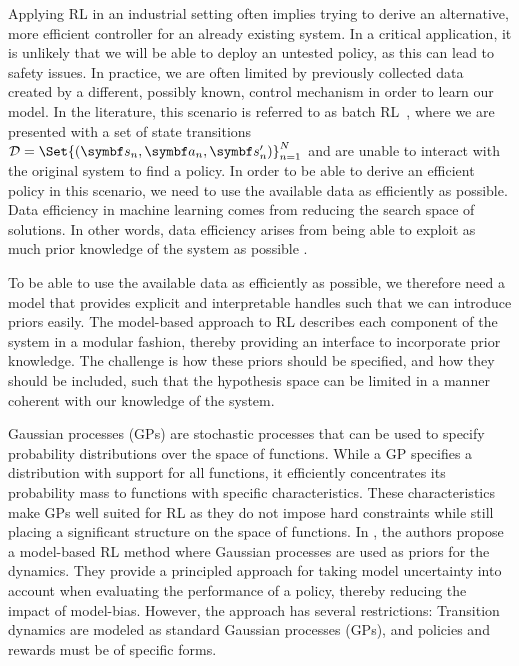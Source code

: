 Applying RL in an industrial setting often implies trying to derive an alternative, more efficient controller for an already existing system.
In a critical application, it is unlikely that we will be able to deploy an untested policy, as this can lead to safety issues.
In practice, we are often limited by previously collected data created by a different, possibly known, control mechanism in order to learn our model.
In the literature, this scenario is referred to as batch RL~\parencite{lange_batch_2012}, where we are presented with a set of state transitions $\Dc = \Set{(\mat{s}_n, \mat{a}_n, \mat{s}_n^\prime)}_{n=1}^N$ and are unable to interact with the original system to find a policy.
In order to be able to derive an efficient policy in this scenario, we need to use the available data as efficiently as possible.
Data efficiency in machine learning comes from reducing the search space of solutions.
In other words, data efficiency arises from being able to exploit as much prior knowledge of the system as possible \parencite{shalev-shwartz_understanding_2014}.

To be able to use the available data as efficiently as possible, we therefore need a model that provides explicit and interpretable handles such that we can introduce priors easily.
The model-based approach to RL describes each component of the system in a modular fashion, thereby providing an interface to incorporate prior knowledge.
The challenge is how these priors should be specified, and how they should be included, such that the hypothesis space can be limited in a manner coherent with our knowledge of the system.

Gaussian processes (GPs) are stochastic processes that can be used to specify probability distributions over the space of functions.
While a GP specifies a distribution with support for all functions, it efficiently concentrates its probability mass to functions with specific characteristics.
These characteristics make GPs well suited for RL as they do not impose hard constraints while still placing a significant structure on the space of functions.
In \parencite{deisenroth_pilco_2011}, the authors propose a model-based RL method where Gaussian processes are used as priors for the dynamics.
They provide a principled approach for taking model uncertainty into account when evaluating the performance of a policy, thereby reducing the impact of model-bias.
However, the approach has several restrictions:
Transition dynamics are modeled as standard Gaussian processes (GPs), and policies and rewards must be of specific forms.

